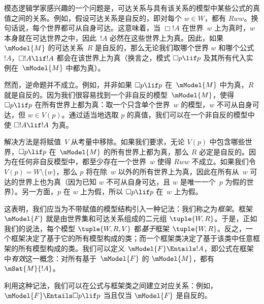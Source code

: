 \documentclass[../../../include/open-logic-section]{subfiles}
\begin{document}


模态逻辑学家感兴趣的一个问题是，可达关系与具有该关系的模型中某些公式的真值之间的关系。例如，假设可达关系是自反的，即对每个 $w \in W$，都有 $Rww$。换句话说，每个世界都可从自身可达。这意味着，当 $\Box !A$ 在世界~$w$ 上为真时，$w$ 本身就在可达世界之中，因此~$!A$ 必然在这些世界上为真。因此，如果~$\mModel{M}$ 的可达关系~$R$ 是自反的，那么无论我们取哪个世界 $w$ 和哪个公式 $!A$，$\Box !A \lif !A$ 都会在该世界上为真（换言之，模式 $\Box p \lif p$ 及其所有代入实例在~$\mModel{M}$ 中都为真）。

然而，逆命题并不成立。例如，并非如果 $\Box p \lif p$ 在~$\mModel{M}$ 中为真，$R$ 就是自反的。因为我们很容易找到一个非自反的模型~$\mModel{M}$，使得 $\Box p \lif p$ 在所有世界上都为真：取一个只含单个世界~$w$ 的模型，$w$ 不可从自身可达，但 $w \in V(p)$。通过适当地选取 $p$ 的真值，我们可以在一个非自反的模型中使 $\Box !A \lif !A$ 为真。

解决方法是将赋值~$V$ 从考量中移除。如果我们要求，无论 $V(p)$ 中包含哪些世界，$\Box p \lif p$ 在~$\mModel{M}$ 的所有世界上都为真，那么 $R$ 必定是自反的。因为在任何非自反模型中，都至少存在一个世界~$w$ 使得 $Rww$ 不成立。如果我们令 $V(p) =
W \setminus \{w\}$，那么 $p$ 将在除~$w$ 以外的所有世界上为真，因此在所有从~$w$ 可达的世界上也为真（因为已知 $w$ 不可从自身可达，且 $w$ 是唯一一个~$p$ 为假的世界）。另一方面，$p$ 在 $w$ 上为假，所以 $\Box p \lif p$ 在~$w$ 上为假。

这表明，我们应当为不带赋值的模型结构引入一种记法：我们称之为\emph{框架}。框架 $\mModel{F}$ 就是由世界集和可达关系组成的二元组 $\tuple{W, R}$。于是，正如我们的说法，每个模型 $\tuple{W, R, V}$ 都\emph{基于}框架 $\tuple{W, R}$。反之，一个框架决定了基于它的所有模型构成的类；而一个框架类决定了基于该类中任意框架的所有模型构成的类。我们可以定义 $\mModel{F} \Entails !A$，即公式在框架中\emph{有效}这一概念：对所有基于~$\mModel{F}$ 的 $\mModel{M}$，都有 $\mSat{M}{!A}$。

利用这种记法，我们可以在公式与框架类之间建立对应关系：例如，$\mModel{F} \Entails \Box p \lif p$ 当且仅当 $\mModel{F}$ 是自反的。
\end{document}
